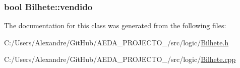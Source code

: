 \subsubsection[{vendido}]{\setlength{\rightskip}{0pt plus 5cm}bool Bilhete\+::vendido\hspace{0.3cm}{\ttfamily [private]}}\label{class_bilhete_abd52894914c56adb4fccf8a9c73a8c95}


The documentation for this class was generated from the following files\+:\begin{DoxyCompactItemize}
\item 
C\+:/\+Users/\+Alexandre/\+Git\+Hub/\+A\+E\+D\+A\+\_\+\+P\+R\+O\+J\+E\+C\+T\+O\+\_/src/logic/\hyperlink{_bilhete_8h}{Bilhete.\+h}\item 
C\+:/\+Users/\+Alexandre/\+Git\+Hub/\+A\+E\+D\+A\+\_\+\+P\+R\+O\+J\+E\+C\+T\+O\+\_/src/logic/\hyperlink{_bilhete_8cpp}{Bilhete.\+cpp}\end{DoxyCompactItemize}
